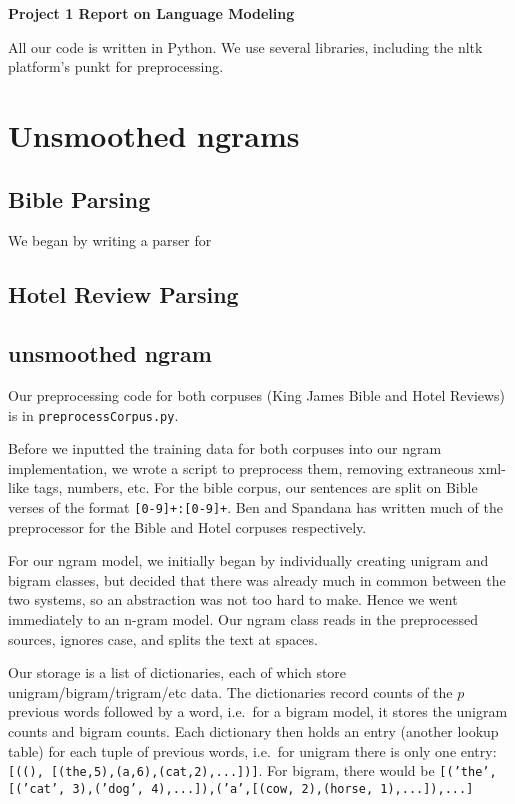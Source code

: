 \documentclass{article}
\begin{document}
\begin{center}\textbf{Project 1 Report on Language Modeling}\end{center}

All our code is written in Python. We use several libraries, including the nltk platform's punkt for preprocessing.\par

\section{Unsmoothed ngrams}

\subsection{Bible Parsing}

We began by writing a parser for 

\subsection{Hotel Review Parsing}

\subsection{unsmoothed ngram}

Our preprocessing code for both corpuses (King James Bible and Hotel Reviews) is in \texttt{preprocessCorpus.py}.\par

Before we inputted the training data for both corpuses into our ngram implementation, we wrote a script to preprocess them, removing extraneous xml-like tags, numbers, etc. For the bible corpus, our sentences are split on Bible verses of the format \texttt{[0-9]+:[0-9]+}. Ben and Spandana has written much of the preprocessor for the Bible and Hotel corpuses respectively.\par

For our ngram model, we initially began by individually creating unigram and bigram classes, but decided that there was already much in common between the two systems, so an abstraction was not too hard to make. Hence we went immediately to an n-gram model. Our ngram class reads in the preprocessed sources, ignores case, and splits the text at spaces.\par

Our storage is a list of dictionaries, each of which store unigram/bigram/trigram/etc data. The dictionaries record counts of the $p$ previous words followed by a word, i.e.\ for a bigram model, it stores the unigram counts and bigram counts. Each dictionary then holds an entry (another lookup table) for each tuple of previous words, i.e.\ for unigram there is only one entry: \texttt{[((), [(the,5),(a,6),(cat,2),...])]}. For bigram, there would be \texttt{[('the',[('cat', 3),('dog', 4),...]),('a',[(cow, 2),(horse, 1),...]),...]}\par
\end{document}

